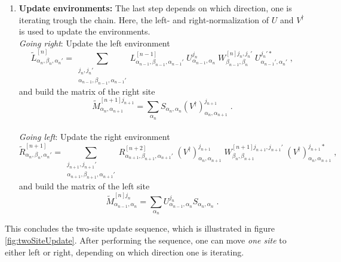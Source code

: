 \begin{enumerate}
\item
\textbf{Update environments:} The last step depends on which direction, one is iterating trough the chain. Here, the left- and right-normalization of $U$ and $V^{\dag}$ is used to update the environments.\\
\textit{Going right}: Update the left environment
\begin{equation}
	\tilde{L}_{\alpha_{n}, \beta_{n} , \alpha_{n} '}^{[n]} = \sum_{\substack{ j_{n} , j_{n} ' \\ \alpha_{n-1} , \beta_{n-1} , \alpha_{n-1} '}} L_{\alpha_{n-1}, \beta_{n-1} , \alpha_{n-1} '}^{[n-1]} \; U_{\alpha_{n-1} , \alpha_{n}}^{j_n} \; W_{\beta_{n-1} , \beta_{n}}^{[n] j_n , j_n '} \; U_{\alpha_{n-1} ', \alpha_{n}'}^{j_n ' *} \; ,
\label{eq:updateLeft}
\end{equation}
and build the matrix of the right site
\begin{equation}
	\tilde{M}_{\alpha_{n} , \alpha_{n+1}}^{[n+1] j_{n+1} } = \sum_{\alpha_n}  S_{\alpha_n , \alpha_n} (V^{\dag})_{\alpha_{n} , \alpha_{n+1}}^{j_{n+1}} \; .
\end{equation}\\ 
\textit{Going left}: Update the right environment
\begin{equation}
	\tilde{R}_{\alpha_{n}, \beta_{n} , \alpha_{n} '}^{[n+1]} = \sum_{\substack{ j_{n+1} , j_{n+1} ' \\ \alpha_{n+1} , \beta_{n+1} , \alpha_{n+1} '}} R_{\alpha_{n+1}, \beta_{n+1} , \alpha_{n+1} '}^{[n+2]} \; \left( V^{\dag} \right)_{\alpha_{n} , \alpha_{n+1}}^{j_{n+1}} \; W_{\beta_{n} , \beta_{n+1}}^{[n+1] j_{n+1} , j_{n+1} '} \; \left( V^{\dag} \right)_{\alpha_{n} , \alpha_{n+1}}^{j_{n+1} *} \; ,
	\label{eq:updateRight}
\end{equation}
and build the matrix of the left site
\begin{equation}
	\tilde{M}_{\alpha_{n-1} , \alpha_{n}}^{[n] j_{n} } = \sum_{\alpha_n} U_{\alpha_{n-1} , \alpha_{n}}^{j_n} S_{\alpha_n , \alpha_n}  \; .
\end{equation} 
 
\end{enumerate}
This concludes the two-site update sequence, which is illustrated in figure \ref{fig:twoSiteUpdate}. After performing the sequence, one can move \textit{one site} to either left or right, depending on which direction one is iterating.

